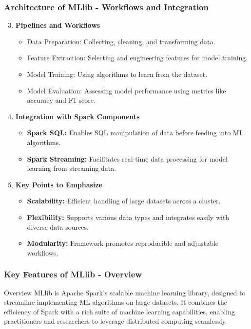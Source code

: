 \documentclass[aspectratio=169]{beamer}
\begin{document}
\begin{frame}[fragile]
    \frametitle{Architecture of MLlib - Workflows and Integration}
    \begin{enumerate}
        \setcounter{enumi}{2}
        \item \textbf{Pipelines and Workflows}
            \begin{itemize}
                \item Data Preparation: Collecting, cleaning, and transforming data.
                \item Feature Extraction: Selecting and engineering features for model training.
                \item Model Training: Using algorithms to learn from the dataset.
                \item Model Evaluation: Assessing model performance using metrics like accuracy and F1-score.
            \end{itemize}
        
        \item \textbf{Integration with Spark Components}
            \begin{itemize}
                \item \textbf{Spark SQL:} Enables SQL manipulation of data before feeding into ML algorithms.
                \item \textbf{Spark Streaming:} Facilitates real-time data processing for model learning from streaming data.
            \end{itemize}
        
        \item \textbf{Key Points to Emphasize}
            \begin{itemize}
                \item \textbf{Scalability:} Efficient handling of large datasets across a cluster.
                \item \textbf{Flexibility:} Supports various data types and integrates easily with diverse data sources.
                \item \textbf{Modularity:} Framework promotes reproducible and adjustable workflows.
            \end{itemize}
    \end{enumerate}
\end{frame}

\begin{frame}[fragile]
    \frametitle{Key Features of MLlib - Overview}
    \begin{block}{Overview}
        MLlib is Apache Spark's scalable machine learning library, designed to streamline implementing ML algorithms on large datasets. It combines the efficiency of Spark with a rich suite of machine learning capabilities, enabling practitioners and researchers to leverage distributed computing seamlessly.
    \end{block}
\end{frame}
\end{document}
